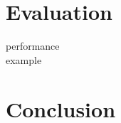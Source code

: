 ﻿\documentclass[
      english,
      ]{llncs}
\begin{document}






\section{Evaluation}
\label{sec:eval}

performance\\

example\\

\section{Conclusion}
\label{sec:conclusion}


\printbibliography
\end{document}
